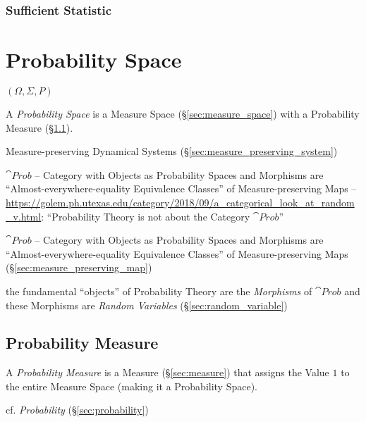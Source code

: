 \subsubsection{Sufficient Statistic}\label{sec:sufficient_statistic}



\section{Probability Space}\label{sec:probability_space}

$(\Omega, \Sigma, P)$

A \emph{Probability Space} is a Measure Space
(\S\ref{sec:measure_space}) with a Probability Measure
(\S\ref{sec:probability_measure}).

\fist Measure-preserving Dynamical Systems
(\S\ref{sec:measure_preserving_system})

$\cat{Prob}$ -- Category with Objects as Probability Spaces and Morphisms are
``Almost-everywhere-equality Equivalence Classes'' of Measure-preserving Maps
--
\url{https://golem.ph.utexas.edu/category/2018/09/a_categorical_look_at_random_v.html}:
``Probability Theory is not about the Category $\cat{Prob}$''

$\cat{Prob}$ -- Category with Objects as Probability Spaces and Morphisms are
``Almost-everywhere-equality Equivalence Classes'' of Measure-preserving Maps
(\S\ref{sec:measure_preserving_map})

the fundamental ``objects'' of Probability Theory are the \emph{Morphisms} of
$\cat{Prob}$ and these Morphisms are \emph{Random Variables}
(\S\ref{sec:random_variable})



\subsection{Probability Measure}\label{sec:probability_measure}

A \emph{Probability Measure} is a Measure (\S\ref{sec:measure}) that assigns the
Value $1$ to the entire Measure Space (making it a Probability Space).

cf. \emph{Probability} (\S\ref{sec:probability})



